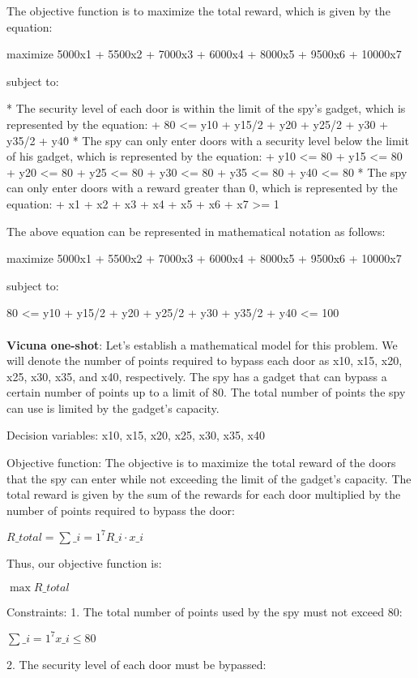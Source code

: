 \documentclass{article}%
\begin{document}
The objective function is to maximize the total reward, which is given by the equation:

maximize 5000x1 + 5500x2 + 7000x3 + 6000x4 + 8000x5 + 9500x6 + 10000x7

subject to:

* The security level of each door is within the limit of the spy's gadget, which is represented by the equation:
	+ 80 <= y10 + y15/2 + y20 + y25/2 + y30 + y35/2 + y40
* The spy can only enter doors with a security level below the limit of his gadget, which is represented by the equation:
	+ y10 <= 80
	+ y15 <= 80
	+ y20 <= 80
	+ y25 <= 80
	+ y30 <= 80
	+ y35 <= 80
	+ y40 <= 80
* The spy can only enter doors with a reward greater than 0, which is represented by the equation:
	+ x1 + x2 + x3 + x4 + x5 + x6 + x7 >= 1

The above equation can be represented in mathematical notation as follows:

maximize 5000x1 + 5500x2 + 7000x3 + 6000x4 + 8000x5 + 9500x6 + 10000x7

subject to:

80 <= y10 + y15/2 + y20 + y25/2 + y30 + y35/2 + y40 <= 100\\\\%
\textbf{Vicuna one-shot}: Let's establish a mathematical model for this problem. We will denote the number of points required to bypass each door as x10, x15, x20, x25, x30, x35, and x40, respectively. The spy has a gadget that can bypass a certain number of points up to a limit of 80. The total number of points the spy can use is limited by the gadget's capacity.

Decision variables:
x10, x15, x20, x25, x30, x35, x40

Objective function:
The objective is to maximize the total reward of the doors that the spy can enter while not exceeding the limit of the gadget's capacity. The total reward is given by the sum of the rewards for each door multiplied by the number of points required to bypass the door:

$R\_{total} = \sum\_{i=1}^7 R\_i \cdot x\_i$

Thus, our objective function is:

$\max R\_{total}$

Constraints:
1. The total number of points used by the spy must not exceed 80:

$\sum\_{i=1}^7 x\_i \leq 80$

2. The security level of each door must be bypassed:
\end{document}
